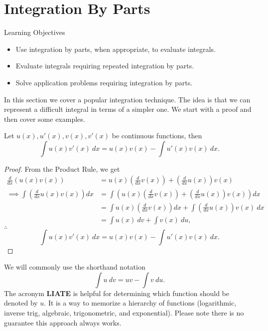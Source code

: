 \documentclass[compacto,10pt,comentarios]{aleph-notas}
\begin{document}
\encabezado

\section*{Integration By Parts}
\begin{mdframed}
    \center Learning Objectives \\
    \begin{itemize}
        \item Use integration by parts, when appropriate, to evaluate integrals.
        \item Evaluate integrals requiring repeated integration by parts.
        \item Solve application problems requiring integration by parts.
    \end{itemize}
\end{mdframed}

In this section we cover a popular integration technique. The idea is that we can represent a difficult integral in terms of a simpler one. We start with a proof and then cover some examples.
\begin{teo}
    Let $u(x), u'(x), v(x), v'(x)$ be continuous functions, then
    $$
        \int u(x) v'(x) ~ dx = u(x) v(x)  - \int u'(x) v(x) ~ dx.
    $$
\end{teo}
\begin{proof}[Proof]
    From the Product Rule, we get
    \begin{align*}
        \frac{d}{dx} \left( u(x)v(x) \right)
            & = u(x) \left(\frac{d}{dx} v(x) \right) + \left( \frac{d}{dx} u(x) \right) v(x) \\
        \implies
        \int \left( \frac{d}{dx} u(x)v(x) \right) dx
        & = \int \left( u(x) \left(\frac{d}{dx} v(x) \right) + \left( \frac{d}{dx} u(x) \right) v(x) \right) dx \\
        & = \int u(x) \left(\frac{d}{dx} v(x) \right) dx + \int \left( \frac{d}{dx} u(x) \right) v(x) ~ dx \\
        & = \int u(x) ~ dv + \int v(x) ~ du,
    \end{align*}
    $\therefore$
    $$
        \int u(x) v'(x) ~ dx = u(x) v(x)  - \int u'(x) v(x) ~ dx.
    $$
\end{proof}
We will commonly use the shorthand notation
$$
    \int u ~ dv = uv - \int v ~ du . 
$$
The acronym \textbf{LIATE} is helpful for determining which function should be denoted by $u$. It is a way to memorize a hierarchy of functions (logarithmic, inverse trig, algebraic, trigonometric, and exponential). Please note there is no guarantee this approach always works.
\end{document}
